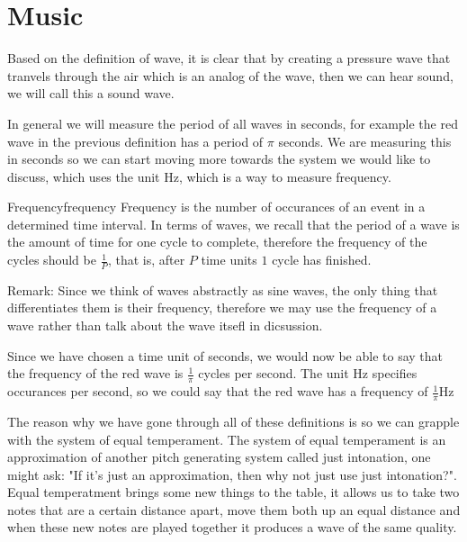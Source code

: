 \chapter{Music}



Based on the definition of wave, it is clear that by creating a pressure wave that tranvels through the air which is an analog of the wave, then we can hear sound, we will call this a sound wave.





In general we will measure the period of all waves in seconds, for example the red wave in the previous definition has a period of $ \pi$ seconds. We are measuring this in seconds so we can start moving more towards the system we would like to discuss, which uses the unit $ \text{Hz}$, which is a way to measure frequency.

\begin{definition}{Frequency}{frequency}
  Frequency is the number of occurances of an event in a determined time interval. In terms of waves, we recall that the period of a wave is the amount of time for one cycle to complete, therefore the frequency of the cycles should be $\frac{1}{P}$, that is, after $ P$ time units $ 1$ cycle has finished.

  Remark: Since we think of waves abstractly as sine waves, the only thing that differentiates them is their frequency, therefore we may use the frequency of a wave rather than talk about the wave itsefl in dicsussion.
\end{definition}

Since we have chosen a time unit of seconds, we would now be able to say that the frequency of the red wave is $ \frac{1}{\pi}$ cycles per second. The unit $ \text{Hz}$ specifies occurances per second, so we could say that the red wave has a frequency of $ \frac{1}{\pi} \text{Hz}$ 


The reason why we have gone through all of these definitions is so we can grapple with the system of equal temperament. The system of equal temperament is an approximation of another pitch generating system called just intonation, one might ask: "If it's just an approximation, then why not just use just intonation?". Equal temperatment brings some new things to the table, it allows us to take two notes that are a certain distance apart, move them both up an equal distance and when these new notes are played together it produces a wave of the same quality.

